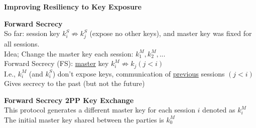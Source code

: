 \documentclass{article}
\begin{document}
\textbf{Improving Resiliency to Key Exposure}

\textbf{Forward Secrecy}\\
So far: session key $k_i^S \nRightarrow k_j^S$ (expose no other keys), and master key was fixed for all sessions.\\
Idea; Change the master key each session: $k_1^M,k_2^M,...$\\
Forward Secrecy (FS): \underline{master} key $k_i^M \nRightarrow k_j(j<i)$\\
I.e., $k_i^M$ (and $k_i^S$) don't expose keys, communication of \underline{previous} sessions $(j<i)$\\
Gives secrecy to the past (but not the future)

\textbf{Forward Secrecy 2PP Key Exchange}\\
This protocol generates a different master key for each session $i$ denoted as $k_i^M$\\
The initial master key shared between the parties is $k_0^M$
\end{document}
